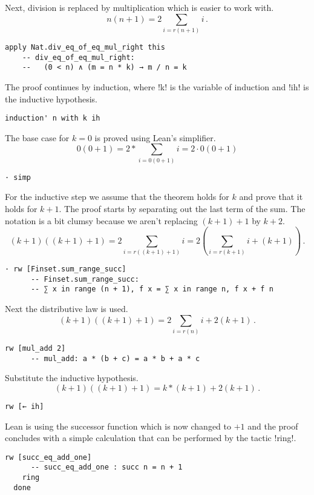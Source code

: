 
Next, division is replaced by multiplication which is easier to work with.
\[
n(n+1) = 2\sum_{i=r(n+1)} i\,.
\]
\begin{Verbatim}[firstnumber=last]
  apply Nat.div_eq_of_eq_mul_right this
    -- div_eq_of_eq_mul_right:
    --   (0 < n) ∧ (m = n * k) → m / n = k
\end{Verbatim}

The proof continues by induction, where !k! is the variable of induction and !ih! is the inductive hypothesis.
\begin{Verbatim}[firstnumber=last]
  induction' n with k ih
\end{Verbatim}


The base case for $k=0$ is proved using Lean's simplifier.
\[
0(0+1) = 2*\sum_{i=0(0+1)} i = 2\cdot 0(0+1)
\]
\begin{Verbatim}[firstnumber=last]
  · simp
\end{Verbatim}

For the inductive step we assume that the theorem holds for $k$ and prove that it holds for $k+1$. The proof starts by separating out the last term of the sum. The notation is a bit clumsy because we aren't replacing $(k+1)+1$ by $k+2$.
\[
(k+1)((k+1)+1)=2\sum_{i=r((k+1)+1)} i=2\left(\sum_{i=r(k+1)} i + (k+1)\right)\,.
\]
\begin{Verbatim}[firstnumber=last]
  · rw [Finset.sum_range_succ]
      -- Finset.sum_range_succ:
      -- ∑ x in range (n + 1), f x = ∑ x in range n, f x + f n
\end{Verbatim}

Next the distributive law is used.
\[
(k+1)((k+1)+1)=2\sum_{i=r(n)} i + 2(k+1)\,.
\]
\begin{Verbatim}[firstnumber=last]
    rw [mul_add 2]
      -- mul_add: a * (b + c) = a * b + a * c
\end{Verbatim}

Substitute the inductive hypothesis.
\[
(k+1)((k+1)+1)=k * (k+1) + 2(k+1)\,.
\]
\begin{Verbatim}[firstnumber=last]
    rw [← ih]
\end{Verbatim}
Lean is using the successor function which is now changed to $+1$ and the proof concludes with a simple calculation that can be performed by the tactic !ring!.
\begin{Verbatim}[firstnumber=last]
    rw [succ_eq_add_one]
      -- succ_eq_add_one : succ n = n + 1
    ring
  done
\end{Verbatim}

